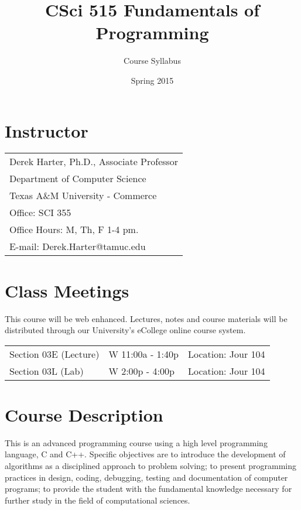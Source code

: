 \documentclass[11pt]{article}
\title{CSci 515 Fundamentals of Programming}
\author{Course Syllabus}
\date{Spring 2015}
\begin{document}
\maketitle


\section*{Instructor}
\label{sec-1}



\begin{center}
\begin{tabular*}{0.9\textwidth}{l}
 Derek Harter, Ph.D., Associate Professor  \\
 Department of Computer Science            \\
 Texas A\&M University - Commerce          \\
 Office: SCI 355                           \\
 Office Hours: M, Th, F 1-4 pm.            \\
 E-mail: Derek.Harter@tamuc.edu            \\
\end{tabular*}
\end{center}
\section*{Class Meetings}
\label{sec-2}


This course will be web enhanced.  Lectures, notes and course
materials will be distributed through our University's eCollege online
course system.


\begin{center}
\begin{tabular*}{0.9\textwidth}{lll}
 Section 03E (Lecture)  &  W 11:00a - 1:40p  &  Location: Jour 104  \\
 Section 03L (Lab)      &  W  2:00p - 4:00p  &  Location: Jour 104  \\
\end{tabular*}
\end{center}
\section*{Course Description}
\label{sec-3}

This is an advanced programming course using a high level programming
language, C and C++. Specific objectives are to introduce the
development of algorithms as a disciplined approach to problem
solving; to present programming practices in design, coding,
debugging, testing and documentation of computer programs; to provide
the student with the fundamental knowledge necessary for further study
in the field of computational sciences.
\end{document}
